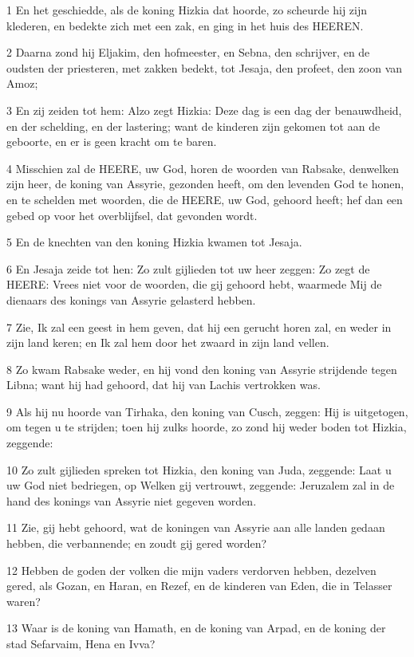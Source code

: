 \par 1 En het geschiedde, als de koning Hizkia dat hoorde, zo scheurde hij zijn klederen, en bedekte zich met een zak, en ging in het huis des HEEREN.
\par 2 Daarna zond hij Eljakim, den hofmeester, en Sebna, den schrijver, en de oudsten der priesteren, met zakken bedekt, tot Jesaja, den profeet, den zoon van Amoz;
\par 3 En zij zeiden tot hem: Alzo zegt Hizkia: Deze dag is een dag der benauwdheid, en der schelding, en der lastering; want de kinderen zijn gekomen tot aan de geboorte, en er is geen kracht om te baren.
\par 4 Misschien zal de HEERE, uw God, horen de woorden van Rabsake, denwelken zijn heer, de koning van Assyrie, gezonden heeft, om den levenden God te honen, en te schelden met woorden, die de HEERE, uw God, gehoord heeft; hef dan een gebed op voor het overblijfsel, dat gevonden wordt.
\par 5 En de knechten van den koning Hizkia kwamen tot Jesaja.
\par 6 En Jesaja zeide tot hen: Zo zult gijlieden tot uw heer zeggen: Zo zegt de HEERE: Vrees niet voor de woorden, die gij gehoord hebt, waarmede Mij de dienaars des konings van Assyrie gelasterd hebben.
\par 7 Zie, Ik zal een geest in hem geven, dat hij een gerucht horen zal, en weder in zijn land keren; en Ik zal hem door het zwaard in zijn land vellen.
\par 8 Zo kwam Rabsake weder, en hij vond den koning van Assyrie strijdende tegen Libna; want hij had gehoord, dat hij van Lachis vertrokken was.
\par 9 Als hij nu hoorde van Tirhaka, den koning van Cusch, zeggen: Hij is uitgetogen, om tegen u te strijden; toen hij zulks hoorde, zo zond hij weder boden tot Hizkia, zeggende:
\par 10 Zo zult gijlieden spreken tot Hizkia, den koning van Juda, zeggende: Laat u uw God niet bedriegen, op Welken gij vertrouwt, zeggende: Jeruzalem zal in de hand des konings van Assyrie niet gegeven worden.
\par 11 Zie, gij hebt gehoord, wat de koningen van Assyrie aan alle landen gedaan hebben, die verbannende; en zoudt gij gered worden?
\par 12 Hebben de goden der volken die mijn vaders verdorven hebben, dezelven gered, als Gozan, en Haran, en Rezef, en de kinderen van Eden, die in Telasser waren?
\par 13 Waar is de koning van Hamath, en de koning van Arpad, en de koning der stad Sefarvaim, Hena en Ivva?
